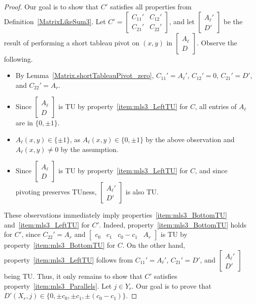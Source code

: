 \begin{proof}
    \leanok
    Our goal is to show that $C'$ satisfies all properties from Definition~\ref{MatrixLikeSum3}. Let $C' = \begin{bmatrix} C_{11}' & C_{12}' \\ C_{21}' & C_{22}' \end{bmatrix}$, and let $\begin{bmatrix} A_{\ell}' \\ D' \end{bmatrix}$ be the result of performing a short tableau pivot on $(x, y)$ in $\begin{bmatrix} A_{\ell} \\ D \end{bmatrix}$. Observe the following.

    \begin{itemize}
        \item By Lemma~\ref{Matrix.shortTableauPivot_zero}, $C_{11}' = A_{\ell}'$, $C_{12}' = 0$, $C_{21}' = D'$, and $C_{22}' = A_{r}$.
        \item Since $\begin{bmatrix} A_{\ell} \\ D \end{bmatrix}$ is TU by property~\ref{item:mls3_LeftTU} for $C$, all entries of $A_{\ell}$ are in $\{0, \pm 1\}$.
        \item $A_{\ell} (x, y) \in \{\pm 1\}$, as $A_{\ell} (x, y) \in \{0, \pm 1\}$ by the above observation and $A_{\ell} (x, y) \neq 0$ by the assumption.
        \item Since $\begin{bmatrix} A_{\ell} \\ D \end{bmatrix}$ is TU by property~\ref{item:mls3_LeftTU} for $C$, and since pivoting preserves TUness, $\begin{bmatrix} A_{\ell}' \\ D' \end{bmatrix}$ is also TU.
    \end{itemize}

    These observations immediately imply properties~\ref{item:mls3_BottomTU} and~\ref{item:mls3_LeftTU} for $C'$. Indeed, property~\ref{item:mls3_BottomTU} holds for $C'$, since $C_{22}' = A_{r}$ and $\begin{bmatrix} c_{0} & c_{1} & c_{0} - c_{1} & A_{r} \end{bmatrix}$ is TU by property~\ref{item:mls3_BottomTU} for $C$. On the other hand, property~\ref{item:mls3_LeftTU} follows from $C_{11}' = A_{\ell}'$, $C_{21}' = D'$, and $\begin{bmatrix} A_{\ell}' \\ D' \end{bmatrix}$ being TU. Thus, it only remains to show that $C'$ satisfies property~\ref{item:mls3_Parallels}. Let $j \in Y_{r}$. Our goal is to prove that $D' (X_{r}, j) \in \{0, \pm c_{0}, \pm c_{1}, \pm (c_{0} - c_{1})\}$.


\end{proof}
